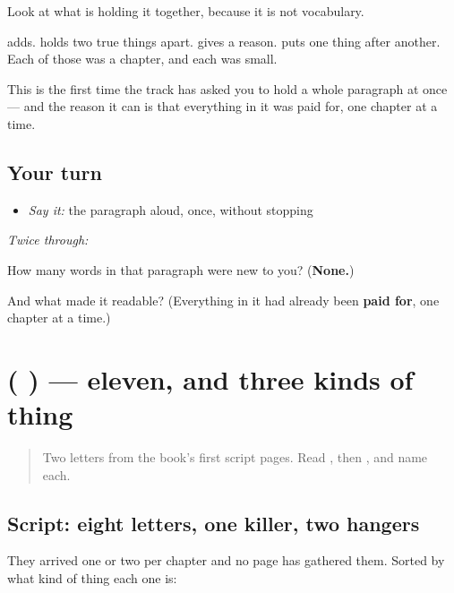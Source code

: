 \begin{culture}
Look at what is holding it together, because it is not vocabulary.

\textbf{} adds. \textbf{} holds two true things apart. \textbf{} gives a reason. \textbf{} puts one thing after another. Each of those was a chapter, and each was small.

This is the first time the track has asked you to hold a whole paragraph at once — and the reason it can is that everything in it was paid for, one chapter at a time.
\end{culture}

\subsection*{Your turn}
\begin{itemize}
\raggedright
  \item \emph{Say it:} the paragraph aloud, once, without stopping
\end{itemize}

\emph{Twice through:}

\begin{tcolorbox}[breakable,colback=teal!4,colframe=teal!35!black,title={Before you move on}]
How many words in that paragraph were new to you? (\textbf{None.})

And what made it readable? (Everything in it had already been \textbf{paid for}, one chapter at a time.)
\end{tcolorbox}
\section[\texorpdfstring{(\hi{म} \hi{र} \hi{न} \hi{अ} \hi{प} \hi{ह} \hi{य} \hi{त} \hi{्} \hi{ा} \hi{ी})}{(म र न अ प ह य त ् ा ी)}]{(          ) — eleven, and three kinds of thing}

\label{lesson:HI-R85-devanagari-recall-a}



\begin{quote}
Two letters from the book's first script pages. Read \textbf{}, then \textbf{}, and name each.
\end{quote}

\subsection*{Script: eight letters, one killer, two hangers}
They arrived one or two per chapter and no page has gathered them. Sorted by what kind of thing each one is:


